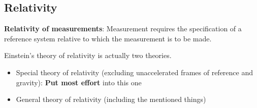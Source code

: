 \subsection{Relativity}
\textbf{Relativity of measurements}: Measurement requires the specification of a reference system relative to which the measurement is to be made.

Einstein's theory of relativity is actually two theories.
\begin{itemize}
    \item Special theory of relativity (excluding unaccelerated frames of reference and gravity): \textbf{Put most effort} into this one
    \item General theory of relativity (including the mentioned things)
\end{itemize}

